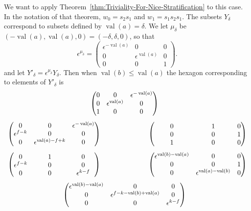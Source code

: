 \documentclass{amsart}
\theoremstyle{definition}
\def\e{\epsilon}
\def\val{\mathop{\mathrm{val}}}
\def\heximagessqueezed#1#2#3#4#5#6#7{
  \heximagessqueezedcarefully{#1}{2em}{#2}{#3}{#4}{#5}{#6}{#7}
}
\def\heximagessqueezedcarefully#1#2#3#4#5#6#7#8{
  \begin{array}{ccc}
    & #3 & \\[#2]
    #5 \hspace{-#1} & & \hspace{-#1} #4 \\[2em]
    #6 \hspace{-#1} & & \hspace{-#1} #7 \\[#2]
    & #8 &
  \end{array}
}
\begin{document}
  We want to apply Theorem~\ref{thm:Triviality-For-Nice-Stratification} to this
  case.  In the notation of that theorem, $w_0 = s_2s_1$ and $w_1 = s_1s_2s_1$.
  The subsets $Y_\delta$ correspond to subsets defined by $\val(a) = \delta$.
  We let $\mu_\delta$ be $(-\val(a), \val(a), 0) = (-\delta, \delta, 0)$, so
  that
  \begin{equation*}
    \e^{\mu_\delta} = \begin{pmatrix}
      \e^{-\val(a)} & 0 & 0 \\
      0 & \e^{\val(a)} & 0 \\
      0 & 0 & 1
    \end{pmatrix}.
  \end{equation*}
  and let $Y'_\delta = \e^{\mu_\delta} Y_\delta$.  Then when $\val(b) \le
  \val(a)$ the hexagon corresponding to elements of $Y'_\delta$ is
  \begin{equation*}
    \heximagessqueezed{6.5em}
    	{\begin{pmatrix}
	    0 & 0 & \e^{-\val(a)} \\
	    0 & \e^{\val(a)} & 0 \\
	    1 & 0 & 0 
	\end{pmatrix}}
	{\begin{pmatrix}
            \hphantom{\e^{\val(b)-\val(a)}} &
	    \hphantom{\e^{\val(a) - \val(b)}} & \\[-1em]
	    0 & 1 & 0 \\
	    0 & 0 & 1  \\
	    1 & 0 & 0
	\end{pmatrix}}
	{\begin{pmatrix}
	    0 & 0 & \e^{-\val(a)} \\
	    \e^{f - k}  & 0 & 0 \\
	    0 & \e^{\val(a) - f + k}  & 0
	\end{pmatrix}}
	{\begin{pmatrix}
            & \hphantom{\e^{k - d + \val(a)}} &
	    \hphantom{\e^{-\val(a)}} \\[-1em]
	    0 & 1 & 0 \\
	    \e^{f-k} & 0 & 0 \\
	    0 & 0 & \e^{k-f} 
	\end{pmatrix}}
	{\begin{pmatrix}
	    \e^{\val(b)-\val(a)}  & 0 & 0 \\
	    0 & 0 & 1 \\
	    0 & \e^{\val(a) - \val(b)} & 0  
	\end{pmatrix}}
	{\begin{pmatrix}
	    \e^{\val(b)-\val(a)} & 0 & 0 \\
	    0 & \e^{f-k-\val(b) + \val(a)} & 0 \\
	    0 & 0 & \e^{k-f} 
	\end{pmatrix}}
  \end{equation*}
\end{document}
